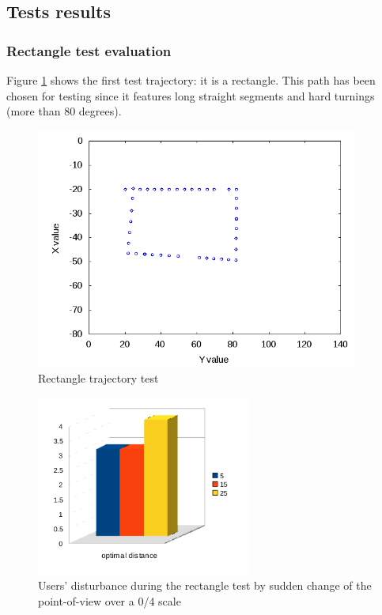 \subsection{Tests results}
\label{performance_evaluation:tests_result}


\subsubsection{Rectangle test evaluation}
\label{performance_evaluation:tests_result:rectangletest}

Figure \ref{fig:rectangletest} shows the first test trajectory:
it is a rectangle. This path has been chosen for testing since it
features long straight segments and hard turnings (more than 80
degrees).

\begin{figure}[!h]
  \begin{center}
    \includegraphics[width=300pt]{img/path_session_9.png}
    \caption{Rectangle trajectory test} 
    \label{fig:rectangletest}
  \end{center}
\end{figure}

\begin{figure}[!h]
  \begin{center}
    \includegraphics[width=200pt]{img/square.png}
    \caption{Users' disturbance during the rectangle test 
      by sudden change of the point-of-view over a 0/4 scale}
  \end{center}
\end{figure}

